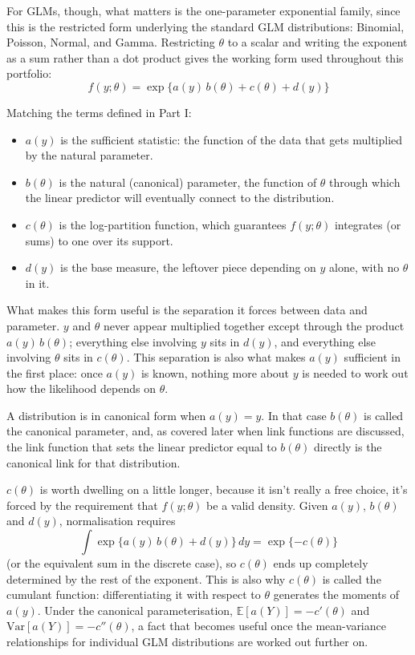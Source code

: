 \documentclass[12pt,a4paper]{report}
\begin{document}
For GLMs, though, what matters is the one-parameter exponential family, since this is the restricted form underlying the standard GLM distributions: Binomial, Poisson, Normal, and Gamma. Restricting $\theta$ to a scalar and writing the exponent as a sum rather than a dot product gives the working form used throughout this portfolio:
\[
f(y;\theta) = \exp\big\{a(y)\,b(\theta) + c(\theta) + d(y)\big\}
\]

Matching the terms defined in Part I:
\begin{itemize}
  \item $a(y)$ is the sufficient statistic: the function of the data that gets multiplied by the natural parameter.
  \item $b(\theta)$ is the natural (canonical) parameter, the function of $\theta$ through which the linear predictor will eventually connect to the distribution.
  \item $c(\theta)$ is the log-partition function, which guarantees $f(y;\theta)$ integrates (or sums) to one over its support.
  \item $d(y)$ is the base measure, the leftover piece depending on $y$ alone, with no $\theta$ in it.
\end{itemize}

What makes this form useful is the separation it forces between data and parameter. $y$ and $\theta$ never appear multiplied together except through the product $a(y)\,b(\theta)$; everything else involving $y$ sits in $d(y)$, and everything else involving $\theta$ sits in $c(\theta)$. This separation is also what makes $a(y)$ sufficient in the first place: once $a(y)$ is known, nothing more about $y$ is needed to work out how the likelihood depends on $\theta$.

A distribution is in canonical form when $a(y) = y$. In that case $b(\theta)$ is called the canonical parameter, and, as covered later when link functions are discussed, the link function that sets the linear predictor equal to $b(\theta)$ directly is the canonical link for that distribution.

$c(\theta)$ is worth dwelling on a little longer, because it isn't really a free choice, it's forced by the requirement that $f(y;\theta)$ be a valid density. Given $a(y)$, $b(\theta)$ and $d(y)$, normalisation requires
\[
\int \exp\{a(y)\,b(\theta) + d(y)\}\,dy = \exp\{-c(\theta)\}
\]
(or the equivalent sum in the discrete case), so $c(\theta)$ ends up completely determined by the rest of the exponent. This is also why $c(\theta)$ is called the cumulant function: differentiating it with respect to $\theta$ generates the moments of $a(y)$. Under the canonical parameterisation, $\mathbb{E}[a(Y)] = -c'(\theta)$ and $\mathrm{Var}[a(Y)] = -c''(\theta)$, a fact that becomes useful once the mean-variance relationships for individual GLM distributions are worked out further on.
\end{document}

